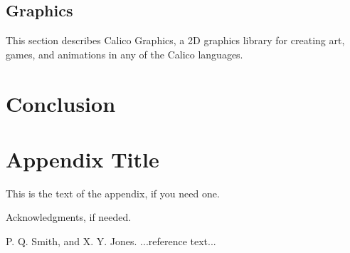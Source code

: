 \documentclass[preprint]{sigplanconf}
\begin{document}
\subsection{Graphics}

This section describes Calico Graphics, a 2D graphics library for
creating art, games, and animations in any of the Calico languages.

\section{Conclusion}

\appendix
\section{Appendix Title}

This is the text of the appendix, if you need one.

\acks

Acknowledgments, if needed.





\begin{thebibliography}{}
\softraggedright

P. Q. Smith, and X. Y. Jones. ...reference text...




\end{thebibliography}
\end{document}
